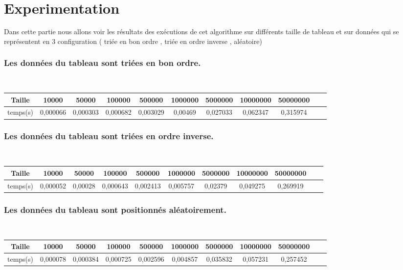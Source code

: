 \section{Experimentation}
Dans cette partie nous allons voir les résultats des exécutions de cet algorithme sur différents taille de tableau et sur données qui se représentent en 3 configuration ( triée en bon ordre , triée en ordre inverse , aléatoire) 
\subsubsection{Les données du tableau sont triées en bon ordre.}
\\
\begin{tabular}{| c | c | c | c | c | c | c | c | c | c | c |}
    \hline 
     Taille &  10000 & 50000 & 100000 & 500000 & 1000000 & 5000000 & 10000000 & 50000000 \\
    \hline
    temps(s) & 0,000066 &	0,000303	 & 0,000682	& 0,003029 & 0,00469 &	0,027033 & 0,062347 &	0,315974	 \\
   \hline
   
\end{tabular}
\par

\subsubsection{Les données du tableau sont triées en ordre inverse.}
\\
\begin{tabular}{| c | c | c | c | c | c | c | c | c | c | c |}
    \hline 
     Taille &  10000 & 50000 & 100000 & 500000 & 1000000 & 5000000 & 10000000 & 50000000 \\
    \hline
    temps(s) & 0,000052 &	0,00028 &	0,000643	 & 0,002413 &	0,005757 &	0,02379 &	0,049275 &	0,269919 \\
   
   \hline
\end{tabular}
\par
\subsubsection{Les données du tableau sont  positionnés aléatoirement.}
\\
\begin{tabular}{| c | c | c | c | c | c | c | c | c | c | c |}
    \hline 
     Taille &  10000 & 50000 & 100000 & 500000 & 1000000 & 5000000 & 10000000 & 50000000  \\
    \hline
    temps(s) & 0,000078 &	0,000384 &	0,000725	& 0,002596 &	0,004857 &	0,035832 &	0,057231 &	0,257452\\
    \hline
   
   
\end{tabular}
\par
